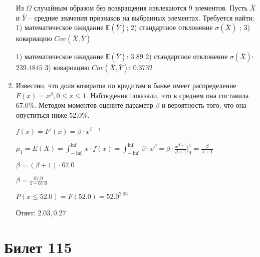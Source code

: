 \documentclass[a4paper,12pt]{article}
\begin{document}
\begin{enumerate}
Из $\Omega$ случайным образом без возвращения извлекаются $9$ элементов. 
Пусть $\bar X$ и $\bar Y$ – средние значения признаков на выбранных элементах. 
Требуется найти: 1) математическое ожидание $\mathbb{E}(\bar Y)$; 2) стандартное отклонение $\sigma(\bar X)$ ; 
3) ковариацию $Cov(\bar X, \bar Y)$




1) математическое ожидание $\mathbb{E}(\bar Y)$: $3.89$ 
2) стандартное отклонение $\sigma(\bar X)$: $239.4845$
3) ковариацию $Cov(\bar X, \bar Y)$: $0.3732$


\item

    
	Известно, что доля возвратов по кредитам в банке имеет распределение $F(x) = x^{\beta}, 0 \le x \le 1$. Наблюдения показали, что в среднем она составила $67.0$\%. Методом моментов оцените параметр $\beta$ и вероятность того, что она опуститься ниже $52.0$\%.
	


	

	$f(x) = F'(x) = \beta \cdot x^{\beta - 1}$

	$\mu_{1} = E(X) = \int_{-\inf}^{\inf}x \cdot f(x) = \int_{-\inf}^{\inf} \beta \cdot x^{\beta} = \beta \cdot \frac{x^{\beta + 1}}{\beta + 1}\bigg|_0^1 = \frac{\beta}{\beta + 1}$

	$\beta = (\beta + 1) \cdot 67.0$

	$\beta = \frac{67.0}{1 - 67.0}$

	$ P(x \le 52.0) = F(52.0) = 52.0^{2.03} $

    Ответ: $2.03, 0.27$
	


\end{enumerate}

\section{Билет 115}
\end{document}
